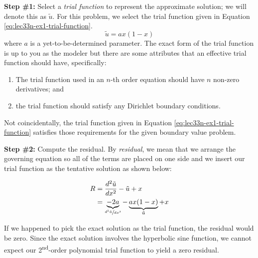 \vspace{0.25cm}

\noindent\textbf{Step \#1:} Select a \emph{trial function} to represent the approximate solution; we will denote this as $\tilde{u}$.  For this problem, we select the trial function given in Equation \ref{eq:lec33n-ex1-trial-function}.  
\begin{equation}
\tilde{u}=ax(1-x)
\label{eq:lec33n-ex1-trial-function}
\end{equation}
where $a$ is a yet-to-be-determined parameter.  The exact form of the trial function is up to you as the modeler but there are some attributes that an effective trial function should have, specifically:
\begin{enumerate}
\item The trial function used in an $n$-th order equation should have $n$ non-zero derivatives; and
\item the trial function should satisfy any Dirichlet boundary conditions.
\end{enumerate} 
Not coincidentally, the trial function given in Equation \ref{eq:lec33n-ex1-trial-function} satisfies those requirements for the given boundary value problem.

\vspace{0.25cm}

\noindent\textbf{Step \#2:} Compute the residual.  By \emph{residual}, we mean that we arrange the governing equation so all of the terms are placed on one side and we insert our trial function as the tentative solution as shown below:

\begin{align*}
R &= \frac{d^2\tilde{u}}{dx^2}-\tilde{u}+x \\
  &=\underbrace{-2a}_{\sfrac{d^2\tilde{u}}{dx^2}} - \underbrace{ax(1-x)}_{\tilde{u}} + x \\
\end{align*}

If we happened to  pick the exact solution as the trial function, the residual would be zero.  Since the exact solution involves the hyperbolic sine function, we cannot expect our 2\textsuperscript{nd}-order polynomial trial function to yield a zero residual.

